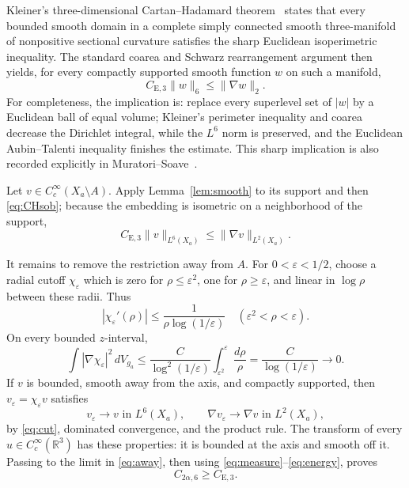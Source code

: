 \documentclass[11pt]{article}
\newcommand{\R}{\mathbb R}
\begin{document}
Kleiner's three-dimensional Cartan--Hadamard theorem~\cite{kleiner} states
that every bounded smooth domain in a complete simply connected smooth
three-manifold of nonpositive sectional curvature satisfies the sharp
Euclidean isoperimetric inequality.  The standard coarea and Schwarz
rearrangement argument then yields, for every compactly supported smooth
function $w$ on such a manifold,
\begin{equation}\label{eq:CHsob}
 C_{\mathrm E,3}\|w\|_6\le\|\nabla w\|_2.
\end{equation}
For completeness, the implication is: replace every superlevel set of
$|w|$ by a Euclidean ball of equal volume; Kleiner's perimeter inequality
and coarea decrease the Dirichlet integral, while the $L^6$ norm is
preserved, and the Euclidean Aubin--Talenti inequality finishes the estimate.
This sharp implication is also recorded explicitly in
Muratori--Soave~\cite{muratori-soave}.

Let $v\in C_c^\infty(X_a\setminus A)$.  Apply
Lemma~\ref{lem:smooth} to its support and then \eqref{eq:CHsob}; because the
embedding is isometric on a neighborhood of the support,
\begin{equation}\label{eq:away}
 C_{\mathrm E,3}\|v\|_{L^6(X_a)}
 \le\|\nabla v\|_{L^2(X_a)}.
\end{equation}

It remains to remove the restriction away from $A$.  For
$0<\varepsilon<1/2$, choose a radial cutoff $\chi_\varepsilon$ which is zero
for $\rho\le\varepsilon^2$, one for $\rho\ge\varepsilon$, and linear in
$\log\rho$ between these radii.  Thus
\[
 |\chi_\varepsilon'(\rho)|
 \le\frac{1}{\rho\log(1/\varepsilon)}
 \quad(\varepsilon^2<\rho<\varepsilon).
\]
On every bounded $z$-interval,
\begin{equation}\label{eq:cut}
 \int |\nabla\chi_\varepsilon|^2\,dV_{g_a}
 \le \frac{C}{\log^2(1/\varepsilon)}
 \int_{\varepsilon^2}^{\varepsilon}\frac{d\rho}{\rho}
 =\frac{C}{\log(1/\varepsilon)}\longrightarrow0.
\end{equation}
If $v$ is bounded, smooth away from the axis, and compactly supported, then
$v_\varepsilon=\chi_\varepsilon v$ satisfies
\[
 v_\varepsilon\to v\text{ in }L^6(X_a),
 \qquad
 \nabla v_\varepsilon\to\nabla v\text{ in }L^2(X_a),
\]
by \eqref{eq:cut}, dominated convergence, and the product rule.
The transform of every $u\in C_c^\infty(\R^3)$ has these properties: it is
bounded at the axis and smooth off it.  Passing to the limit in
\eqref{eq:away}, then using \eqref{eq:measure}--\eqref{eq:energy}, proves
\[
 C_{2\alpha,6}\ge C_{\mathrm E,3}.
\]
\end{document}
